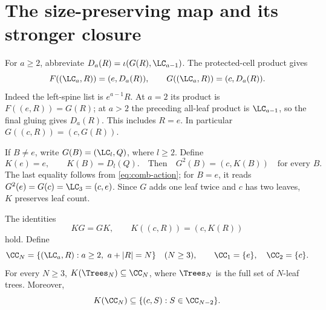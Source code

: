\section{The size-preserving map and its stronger closure}\label{sec:k}

For \(a\ge2\), abbreviate
\(D_a(R)=\iota(G(R),\LC_{a-1})\).
The protected-cell product gives
\begin{equation}\label{eq:comb-action}
 F((\LC_a,R))=(e,D_a(R)),\qquad
 G((\LC_a,R))=(c,D_a(R)).
\end{equation}
Indeed the left-spine list is \(e^{a-1}R\).
At \(a=2\) its product is \(F((e,R))=G(R)\);
at \(a>2\) the preceding all-leaf product is \(\LC_{a-1}\), so the
final gluing gives \(D_a(R)\). This includes \(R=e\).
In particular \(G((c,R))=(c,G(R))\).

If \(B\ne e\), write \(G(B)=(\LC_l,Q)\), where \(l\ge2\).
Define
\begin{equation}\label{eq:k-definition}
 K(e)=e,\qquad K(B)=D_l(Q).
 \quad\text{Then}\quad G^2(B)=(c,K(B))\quad\text{for every }B.
\end{equation}
The last equality follows from \eqref{eq:comb-action}; for \(B=e\),
it reads \(G^2(e)=G(c)=\LC_3=(c,e)\).
Since \(G\) adds one leaf twice and \(c\) has two leaves, \(K\)
preserves leaf count.

\begin{lemma}\label{lem:k}
The identities
\begin{equation}\label{eq:intertwine}
 KG=GK,\qquad K((c,R))=(c,K(R))
\end{equation}
hold. Define
\[
 \CC_N=\{(\LC_a,R):a\ge2,\ a+|R|=N\}\quad(N\ge3),
 \qquad \CC_1=\{e\},\quad\CC_2=\{c\}.
\]
For every \(N\ge3\), \(K(\Trees_N)\subseteq\CC_N\), where \(\Trees_N\)
is the full set of \(N\)-leaf trees. Moreover,
\begin{equation}\label{eq:strong-closure}
 K(\CC_N)\subseteq\{(c,S):S\in\CC_{N-2}\}.
\end{equation}
\end{lemma}

